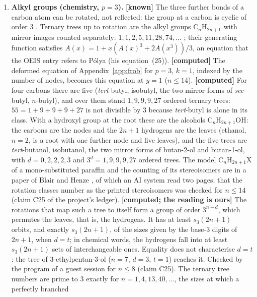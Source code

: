 \documentclass[11pt]{article}
\theoremstyle{definition}
\theoremstyle{remark}
\numberwithin{equation}{section}
\numberwithin{figure}{section}
\begin{document}
\begin{enumerate}[leftmargin=1.6em,itemsep=3pt]
\item \textbf{Alkyl groups (chemistry, $p=3$).} \textbf{[known]} The three further bonds of a carbon atom can
be rotated, not reflected: the group at a carbon is cyclic of order $3$ \cite{RHB}. Ternary trees up to
rotation are the alkyl groups C$_n$H$_{2n+1}$ with mirror images counted separately:
$1,1,2,5,11,28,74,\dots$ \cite{OEISA000625}; their generating function satisfies
$A(x)=1+x(A(x)^3+2A(x^3))/3$, an equation that the OEIS entry refers to P\'olya \cite{Polya} (his
equation~(25)). \textbf{[computed]} The deformed equation of Appendix~\ref{app:frob} for $p=3$, $k=1$,
indexed by the number of nodes, becomes this equation at $y=1$ ($n\le14$). \textbf{[computed]} For four
carbons there are five (\emph{tert}-butyl,
isobutyl, the two mirror forms of \emph{sec}-butyl, $n$-butyl), and over them stand $1,9,9,9,27$ ordered
ternary trees: $55=1+9+9+9+27$ is not divisible by $3$ because \emph{tert}-butyl is alone in its class.
With a hydroxyl group at the root these are the alcohols C$_n$H$_{2n+1}$OH: the carbons are the nodes and the
$2n+1$ hydrogens are the leaves (ethanol, $n=2$, is a root with one further node and five leaves), and the
five trees are \emph{tert}-butanol, isobutanol, the two mirror forms of butan-2-ol and butan-1-ol, with
$d=0,2,2,2,3$ and $3^d=1,9,9,9,27$ ordered trees. The model C$_n$H$_{2n+1}$X of a mono-substituted paraffin
and the counting of its stereoisomers are in a paper of Blair and Henze \cite{BlairHenze}, of which an AI
system read two pages; that the rotation classes number as the printed stereoisomers was checked for
$n\le14$ (claim C25 of the project's ledger). \textbf{[computed; the reading is ours]} The rotations that
map such a tree to itself form a group of order $3^{n-d}$, which permutes the leaves, that is, the
hydrogens. It has at least $s_3(2n+1)$ orbits, and exactly $s_3(2n+1)$, of the sizes given by the base-$3$
digits of $2n+1$, when $d=t$; in chemical words, the hydrogens fall into at least $s_3(2n+1)$ sets of
interchangeable ones. Equality does not characterise $d=t$: the tree of 3-ethylpentan-3-ol ($n=7$, $d=3$,
$t=1$) reaches it. Checked by the program of a guest session for $n\le8$ (claim C25). The
ternary tree numbers are prime to $3$ exactly for $n=1,4,13,40,\dots$, the sizes at which a perfectly branched

\end{enumerate}
\end{document}
